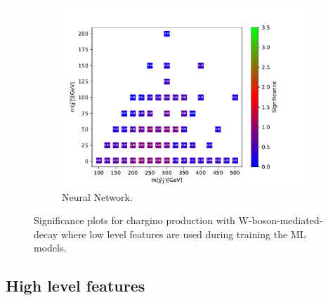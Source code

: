 \begin{figure}[H]
    \begin{subfigure}[t!]{0.49\textwidth}
    \includegraphics[width = \textwidth]{Figures/Significances/significance_NN_WW_Low_level.pdf}
    \caption{Neural Network.}
        \label{fig:signLowWWNN}
    \end{subfigure}
    \caption{Significance plots for chargino production with W-boson-mediated-decay where low level features are used during training the ML models.}
    \label{fig:signLowWW}
\end{figure}

\subsection{High level features}

